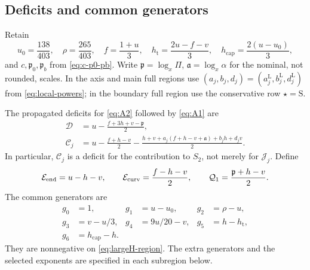 \documentclass[11pt,a4paper]{article}
\numberwithin{equation}{section}
\theoremstyle{remark}
\newcommand{\hcap}{h_{\mathrm{cap}}}
\newcommand{\hthreshold}{h_{\mathrm t}}
\newcommand{\Qone}{\mathcal Q_1}
\begin{document}
\subsection{Deficits and common generators}
Retain
\[
 u_0=\frac{138}{403},\quad \rho=\frac{265}{403},\quad
 f=\frac{1+u}{3},\quad
 \hthreshold=\frac{2u-f-v}{3},\quad
 \hcap=\frac{2(u-u_0)}3,
\]
and $c,\mathfrak p_0,\mathfrak p_b$ from \eqref{eq:c-p0-pb}.
Write $\mathfrak p=\log_x\Pi$, $\mathfrak a=\log_x\alpha$ for the
nominal, not rounded, scales. In the axis and main full regions use
$(a_j,b_j,d_j)=(a_j^{\mathrm L},b_j^{\mathrm L},d_j^{\mathrm L})$
from \eqref{eq:local-powers}; in the boundary full region use the
conservative row $\star=\mathrm S$.

The propagated deficits for \eqref{eq:A2} followed by \eqref{eq:A1} are
\begin{align}
 \mathcal D&=u-\frac{f+3h+v-\mathfrak p}{2},\label{eq:deficit-D}\\
 \mathcal C_j&=u-\frac{f+h-v}{2}
 -\frac{h+v+a_j(f+h-v+\mathfrak a)+b_jh+d_jv}{2}.
 \label{eq:deficit-J}
\end{align}
In particular, $\mathcal C_j$ is a deficit for the contribution to
$S_2$, not merely for $\mathcal J_j$. Define
\[
 \mathcal E_{\rm end}=u-h-v,\qquad
 \mathcal E_{\rm curv}=\frac{f-h-v}{2},\qquad
 \Qone=\frac{\mathfrak p+h-v}{2}.
\]
The common generators are
\begin{align*}
 g_0&=1,&g_1&=u-u_0,&g_2&=\rho-u,\\
 g_3&=v-u/3,&g_4&=9u/20-v,&g_5&=h-\hthreshold,\\
 g_6&=\hcap-h.
\end{align*}
They are nonnegative on \eqref{eq:largeH-region}. The extra generators
and the selected exponents are specified in each subregion below.
\end{document}
